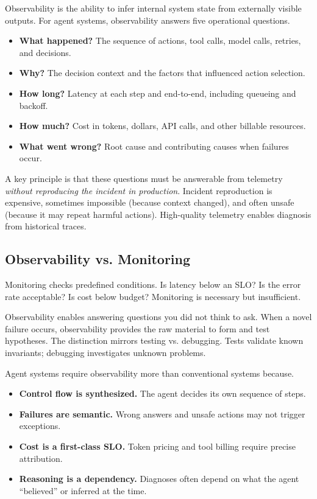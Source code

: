 Observability is the ability to infer internal system state from externally visible outputs. For agent systems, observability answers five operational questions.

\begin{itemize}
\item \textbf{What happened?} The sequence of actions, tool calls, model calls, retries, and decisions.
\item \textbf{Why?} The decision context and the factors that influenced action selection.
\item \textbf{How long?} Latency at each step and end-to-end, including queueing and backoff.
\item \textbf{How much?} Cost in tokens, dollars, API calls, and other billable resources.
\item \textbf{What went wrong?} Root cause and contributing causes when failures occur.
\end{itemize}

A key principle is that these questions must be answerable from telemetry \emph{without reproducing the incident in production}. Incident reproduction is expensive, sometimes impossible (because context changed), and often unsafe (because it may repeat harmful actions). High-quality telemetry enables diagnosis from historical traces.

\subsection{Observability vs. Monitoring}

Monitoring checks predefined conditions. Is latency below an SLO? Is the error rate acceptable? Is cost below budget? Monitoring is necessary but insufficient.

Observability enables answering questions you did not think to ask. When a novel failure occurs, observability provides the raw material to form and test hypotheses. The distinction mirrors testing vs. debugging. Tests validate known invariants; debugging investigates unknown problems.

Agent systems require observability more than conventional systems because.
\begin{itemize}
\item \textbf{Control flow is synthesized.} The agent decides its own sequence of steps.
\item \textbf{Failures are semantic.} Wrong answers and unsafe actions may not trigger exceptions.
\item \textbf{Cost is a first-class SLO.} Token pricing and tool billing require precise attribution.
\item \textbf{Reasoning is a dependency.} Diagnoses often depend on what the agent ``believed'' or inferred at the time.
\end{itemize}

